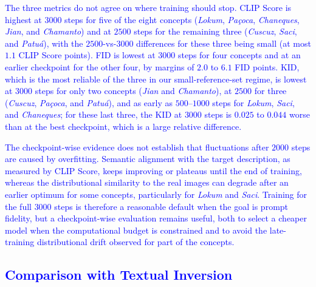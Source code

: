 \documentclass[pdflatex,sn-mathphys-num]{sn-jnl}%
\theoremstyle{thmstyleone}%
\theoremstyle{thmstyletwo}%
\theoremstyle{thmstylethree}%
\begin{document}
\textcolor{blue}{The three metrics do not agree on where training should stop. CLIP Score is highest at $3000$ steps for five of the eight concepts (\textit{Lokum}, \textit{Pa\c{c}oca}, \textit{Chaneques}, \textit{Jian}, and \textit{Chamanto}) and at $2500$ steps for the remaining three (\textit{Cuscuz}, \textit{Saci}, and \textit{Patu\'a}), with the $2500$-vs-$3000$ differences for these three being small (at most $1.1$ CLIP Score points). FID is lowest at $3000$ steps for four concepts and at an earlier checkpoint for the other four, by margins of $2.0$ to $6.1$ FID points. KID, which is the most reliable of the three in our small-reference-set regime, is lowest at $3000$ steps for only two concepts (\textit{Jian} and \textit{Chamanto}), at $2500$ for three (\textit{Cuscuz}, \textit{Pa\c{c}oca}, and \textit{Patu\'a}), and as early as $500$--$1000$ steps for \textit{Lokum}, \textit{Saci}, and \textit{Chaneques}; for these last three, the KID at $3000$ steps is $0.025$ to $0.044$ worse than at the best checkpoint, which is a large relative difference.}

\textcolor{blue}{The checkpoint-wise evidence does not establish that fluctuations after $2000$ steps are caused by overfitting. Semantic alignment with the target description, as measured by CLIP Score, keeps improving or plateaus until the end of training, whereas the distributional similarity to the real images can degrade after an earlier optimum for some concepts, particularly for \textit{Lokum} and \textit{Saci}. Training for the full $3000$ steps is therefore a reasonable default when the goal is prompt fidelity, but a checkpoint-wise evaluation remains useful, both to select a cheaper model when the computational budget is constrained and to avoid the late-training distributional drift observed for part of the concepts.}

\subsection{\textcolor{blue}{Comparison with Textual Inversion}}
\label{sec:ti-comparison}
\end{document}
